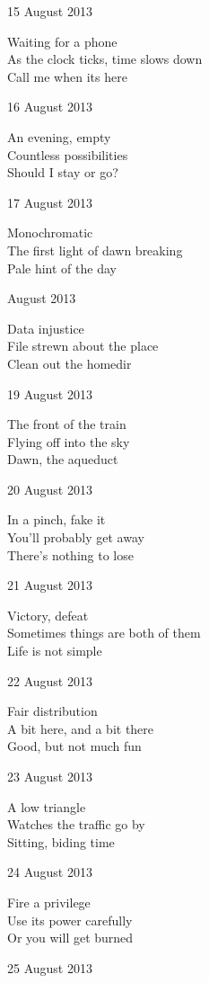 \documentclass[12pt]{article}
\begin{document}
15 August 2013

Waiting for a phone \\
As the clock ticks, time slows down \\
Call me when its here

16 August 2013

An evening, empty \\
Countless possibilities \\
Should I stay or go?

17 August 2013

Monochromatic \\
The first light of dawn breaking \\
Pale hint of the day

 August 2013

Data injustice \\
File strewn about the place \\
Clean out the homedir

19 August 2013

The front of the train \\
Flying off into the sky \\
Dawn, the aqueduct

20 August 2013

In a pinch, fake it \\
You'll probably get away \\
There's nothing to lose

21 August 2013

Victory, defeat \\
Sometimes things are both of them \\
Life is not simple

22 August 2013

Fair distribution \\
A bit here, and a bit there \\
Good, but not much fun

23 August 2013

A low triangle \\
Watches the traffic go by \\
Sitting, biding time

24 August 2013

Fire a privilege \\
Use its power carefully \\
Or you will get burned

\newpage

25 August 2013
\end{document}
